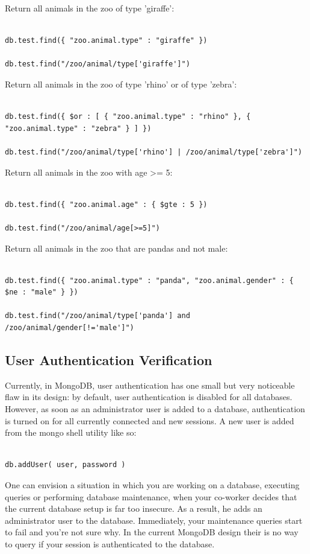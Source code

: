 \documentclass{../dependencies/acm_proc_article-sp}
\begin{document}
Return all animals in the zoo of type 'giraffe':
\begin{lstlisting}

db.test.find({ "zoo.animal.type" : "giraffe" })

db.test.find("/zoo/animal/type['giraffe']")
\end{lstlisting}

Return all animals in the zoo of type 'rhino' or of type 'zebra':
\begin{lstlisting}

db.test.find({ $or : [ { "zoo.animal.type" : "rhino" }, { "zoo.animal.type" : "zebra" } ] })

db.test.find("/zoo/animal/type['rhino'] | /zoo/animal/type['zebra']")
\end{lstlisting}

Return all animals in the zoo with age >= 5:
\begin{lstlisting}

db.test.find({ "zoo.animal.age" : { $gte : 5 })

db.test.find("/zoo/animal/age[>=5]")
\end{lstlisting}

Return all animals in the zoo that are pandas and not male:
\begin{lstlisting}

db.test.find({ "zoo.animal.type" : "panda", "zoo.animal.gender" : { $ne : "male" } })

db.test.find("/zoo/animal/type['panda'] and /zoo/animal/gender[!='male']")
\end{lstlisting}

\subsection{User Authentication Verification}
Currently, in MongoDB, user authentication has one small but very noticeable flaw in its design: by
default, user authentication is disabled for all databases. However, as soon as an administrator
user is added to a database, authentication is turned on for all currently connected and new sessions.
A new user is added from the mongo shell utility like so:
\begin{lstlisting}

db.addUser( user, password )
\end{lstlisting}

One can envision a situation in which you are working on a database, executing queries
or performing database maintenance, when your co-worker decides that the current database setup
is far too insecure. As a result, he adds an administrator user to the database.
Immediately, your maintenance queries start to fail and you're not sure why. In the current MongoDB design their is no way
to query if your session is authenticated to the database.
\end{document}
